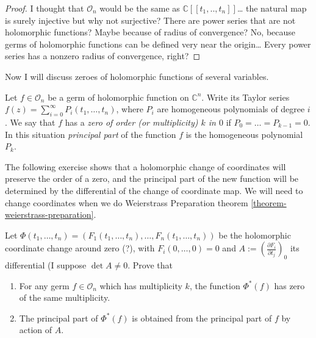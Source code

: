 \begin{proof}
I thought that $\mathcal{O}_n$ would be the same as 
$\mathbb{C}[\![ t_1,..,t_n]\!]$… the natural map is surely injective
but why not surjective? There are power series that are not holomorphic
functions? Maybe because of radius of convergence? No, because germs of
holomorphic functions can be defined very near the origin… Every power series
has a nonzero radius of convergence, right?
\end{proof}

\noindent
Now I will discuss zeroes of holomorphic functions of several variables.

\begin{definition}
\label{definition-zero-of-holomorphic-function-of-several-variables}
Let  $f\in \mathcal{O}_n$ be a germ of holomorphic function on $\mathbb{C}^n$.
Write its Taylor series $f(z)=\sum_{i=0}^\infty P_i(t_1,\ldots,t_n)$, where
$P_i$ are homogeneous polynomials of degree $i$. We say that $f$ has a {\it
zero of order (or multiplicity) $k$ in $0$} if $P_0=\ldots=P_{k-1}=0$. In this
situation {\it principal part} of the function $f$ is the homogeneous polynomial
$P_k$.
\end{definition}

The following exercise shows that a holomorphic change of coordinates will
preserve the order of a zero, and the principal part of the new function will be
determined by the differential of the change of coordinate map. We will need to
change coordinates when we do Weierstrass Preparation theorem
\ref{theorem-weierstrass-preparation}.

\begin{exercise}
\label{exercise-principal-part-under-coordinate-change}
Let $\Phi(t_1,\ldots,t_n)=(F_1(t_1,\ldots,t_n),\ldots,F_n(t_1,\ldots,t_n))$ be
the holomorphic coordinate change around zero (?), with $F_i(0,\ldots,0)=0$ and
$A:=\left(\frac{\partial F_i}{\partial t_j}\right)_0$ its differential (I suppose
$\det A \neq 0$. Prove that
\begin{enumerate}
\item For any germ $f\in \mathcal{O}_n$ which has multiplicity $k$, the function
$\Phi^*(f)$ has zero of the same multiplicity.
\item The principal part of $\Phi^*(f)$ is obtained from the principal part of
$f$ by action of $A$.
\end{enumerate}
\end{exercise}

